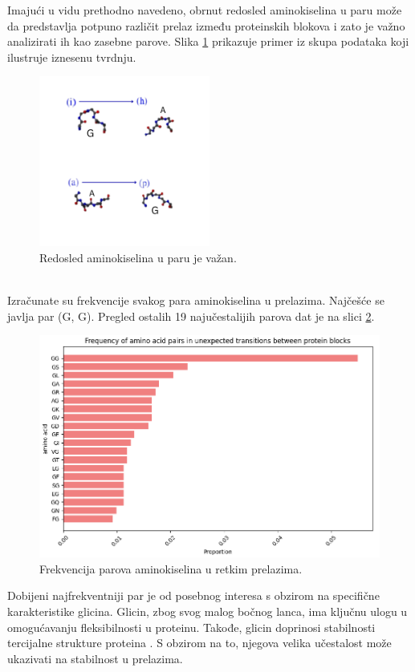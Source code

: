 \documentclass[a4paper,12pt]{article}
\begin{document}
Imajući u vidu prethodno navedeno, obrnut redosled aminokiselina u paru može da predstavlja potpuno različit prelaz između proteinskih blokova i zato je važno analizirati ih kao zasebne parove. Slika \ref{Slika:aa} prikazuje primer iz skupa podataka koji ilustruje iznesenu tvrdnju.
\begin{figure}[htbp]
    \centering
    \includegraphics[width=0.5\textwidth]{./images/aa.png}
    \caption{Redosled aminokiselina u paru je važan.}
    \label{Slika:aa}
\end{figure}
\\
Izračunate su frekvencije svakog para aminokiselina u prelazima. Najčešće se javlja par (G, G). Pregled ostalih 19 najučestalijih parova dat je na slici \ref{Slika:aafreq}.
\begin{figure}[htbp]
    \centering
    \includegraphics[width=1\textwidth]{./images/aafreq.png}
    \caption{Frekvencija parova aminokiselina u retkim prelazima.}
    \label{Slika:aafreq}
\end{figure}
\newpage
Dobijeni najfrekventniji par je od posebnog interesa s obzirom na specifične karakteristike glicina.
Glicin, zbog svog malog bočnog lanca, ima ključnu ulogu u omogućavanju fleksibilnosti u proteinu. Takođe, glicin doprinosi stabilnosti tercijalne strukture proteina \cite{dong2012glycines}. S obzirom na to, njegova velika učestalost može ukazivati na stabilnost u prelazima.
\end{document}
